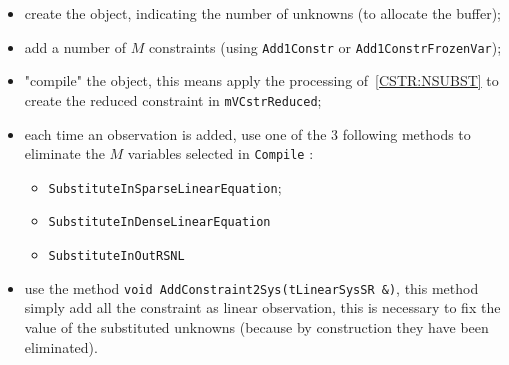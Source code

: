 \begin{itemize}
    \item   create the object, indicating the number of unknowns (to allocate the buffer);
    \item   add a number of $M$ constraints (using {\tt Add1Constr} or {\tt Add1ConstrFrozenVar});
    \item   "compile" the object, this means apply the processing of~\ref{CSTR:NSUBST} to create the
	    reduced constraint in {\tt mVCstrReduced};
    \item   each time an observation is added, use one of the $3$ following methods to eliminate the $M$ variables 
	    selected in {\tt Compile} :
	    \begin{itemize}
                 \item {\tt SubstituteInSparseLinearEquation}; 
                 \item {\tt SubstituteInDenseLinearEquation} 
                 \item {\tt SubstituteInOutRSNL}
	    \end{itemize}
    \item    use the method {\tt void AddConstraint2Sys(tLinearSysSR \&)}, this method simply add all the constraint
             as linear observation, this is necessary to fix the value of the substituted unknowns (because by 
             construction they have been eliminated).

\end{itemize}





